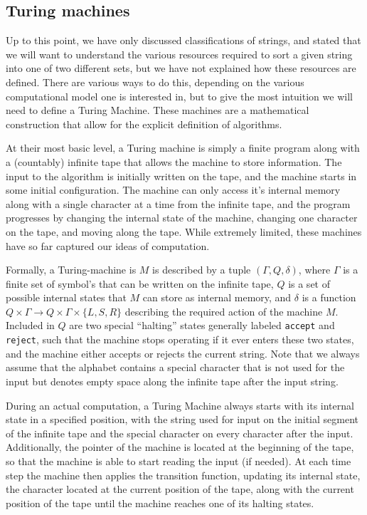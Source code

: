 \documentclass[../thesis-main/thesis-main]{subfiles}
\begin{document}

\subsection{Turing machines}



Up to this point, we have only discussed classifications of strings, and stated that we will want to understand the various resources required to sort a given string into one of two different sets, but we have not explained how these resources are defined.  There are various ways to do this, depending on the various computational model one is interested in, but to give the most intuition we will need to define a Turing Machine.  These machines are a mathematical construction that allow for the explicit definition of algorithms.  

At their most basic level, a Turing machine is simply a finite program along with a (countably) infinite tape that allows the machine to store information.  The input to the algorithm is initially written on the tape, and the machine starts in some initial configuration.  The machine can only access it's internal memory along with a single character at a time from the infinite tape, and the program progresses by changing the internal state of the machine, changing one character on the tape, and moving along the tape.  While extremely limited, these machines have so far captured our ideas of computation.

Formally, a Turing-machine is $M$ is described by a tuple $(\Gamma,Q,\delta)$, where $\Gamma$ is a finite set of symbol's that can be written on the infinite tape, $Q$ is a set of possible internal states that $M$ can store as internal memory, and $\delta$ is a function $Q\times \Gamma \rightarrow Q \times \Gamma\times \{L,S,R\}$ describing the required action of the machine $M$.  Included in $Q$ are two special ``halting'' states generally labeled \texttt{accept} and \texttt{reject}, such that the machine stops operating if it ever enters these two states, and the machine either accepts or rejects the current string.  Note that we always assume that the alphabet contains a special character \textvisiblespace that is not used for the input but denotes empty space along the infinite tape after the input string.

During an actual computation, a Turing Machine always starts with its internal state in a specified position, with the string used for input on the initial segment of the infinite tape and the special character \textvisiblespace on every character after the input.  Additionally, the pointer of the machine is located at the beginning of the tape, so that the machine is able to start reading the input (if needed).  At each time step the machine then applies the transition function, updating its internal state, the character located at the current position of the tape, along with the current position of the tape until the machine reaches one of its halting states.
\end{document}
